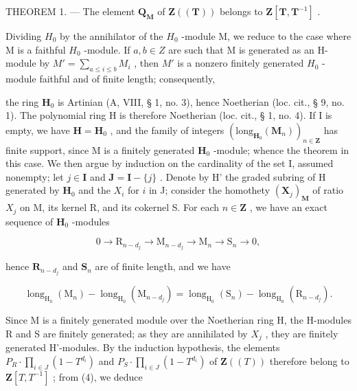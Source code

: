 THEOREM 1. --- The element \(\mathbf{Q}_{\mathbf{M}}\) of \(\mathbf{Z}((\mathbf{T}))\) belongs to \(\mathbf{Z}[\mathbf{T}, \mathbf{T}^{-1}]\) .

Dividing \(H_{0}\) by the annihilator of the \(H_{0}\) -module M, we reduce to the case where M is a faithful \(H_{0}\) -module. If \(a, b \in Z\) are such that M is generated as an H-module by \(M' = \sum_{a \leqslant i \leqslant b} M_{i}\) , then \(M'\) is a nonzero finitely generated \(H_{0}\) -module faithful and of finite length; consequently,

the ring \(\mathbf{H}_0\) is Artinian (A, VIII, § 1, no. 3), hence Noetherian (loc. cit., § 9, no. 1). The polynomial ring H is therefore Noetherian (loc. cit., § 1, no. 4). If I is empty, we have \(\mathbf{H} = \mathbf{H}_0\) , and the family of integers \((\mathrm{long}_{\mathbf{H}_0}(\mathbf{M}_n))_{n \in \mathbf{Z}}\) has finite support, since M is a finitely generated \(\mathbf{H}_0\) -module; whence the theorem in this case. We then argue by induction on the cardinality of the set I, assumed nonempty; let \(j \in \mathbf{I}\) and \(\mathbf{J} = \mathbf{I} - \{j\}\) . Denote by H' the graded subring of H generated by \(\mathbf{H}_0\) and the \(X_i\) for \(i\) in J; consider the homothety \((\mathbf{X}_j)_\mathbf{M}\) of ratio \(X_j\) on M, its kernel R, and its cokernel S. For each \(n \in \mathbf{Z}\) , we have an exact sequence of \(\mathbf{H}_0\) -modules

\[
0 \rightarrow \mathrm{R} _ {n - d _ {j}} \rightarrow \mathrm{M} _ {n - d _ {j}} \rightarrow \mathrm{M} _ {n} \rightarrow \mathrm{S} _ {n} \rightarrow 0,
\]

hence \(\mathbf{R}_{n - d_j}\) and \(\mathbf{S}_n\) are of finite length, and we have

\[
\operatorname{long} _ {\mathrm{H} _ {0}} \left(\mathrm{M} _ {n}\right) - \operatorname{long} _ {\mathrm{H} _ {0}} \left(\mathrm{M} _ {n - d _ {j}}\right) = \operatorname{long} _ {\mathrm{H} _ {0}} \left(\mathrm{S} _ {n}\right) - \operatorname{long} _ {\mathrm{H} _ {0}} \left(\mathrm{R} _ {n - d _ {j}}\right).\tag{4}
\]

Since M is a finitely generated module over the Noetherian ring H, the H-modules R and S are finitely generated; as they are annihilated by \(X_{j}\) , they are finitely generated H'-modules. By the induction hypothesis, the elements \(P_{R}\cdot\prod_{i\in J}(1-T^{d_{i}})\) and \(P_{S}\cdot\prod_{i\in J}(1-T^{d_{i}})\) of \(\mathbf{Z}((T))\) therefore belong to \(\mathbf{Z}[T,T^{-1}]\) ; from (4), we deduce

